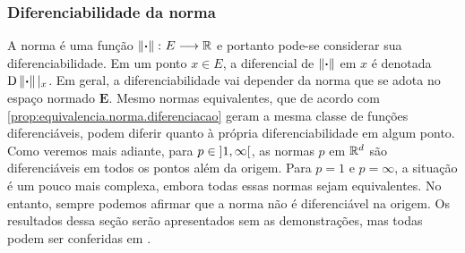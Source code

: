 \begin{comment}


\begin{proposition}
\label{prop:diferenciavel.propriedade}
Sejam $\bm E$ e $\bm E'$ espaços normados, $A \subseteq E$ um aberto, $x \in A$ e $\fun{f}{A}{E'}$ uma função diferenciável em $x$.
Se $\fun{\D f|_x}{E}{E'}$ é injetiva, então existem $\delta,c \in \R_{>0}$ tais que, para todos $x',x'' \in \bola{x}{\delta}$,
	\begin{equation*}
	\nor{f(x'') - f(x')} \geq c\nor{x''-x'}.
	\end{equation*}
Segue que $\fun{f|_{\bola{x}{\delta}}}{\bola{x}{\delta}}{f(\bola{x}{\delta})}$ é um homeomorfismo.
\end{proposition}

\begin{proposition}
\label{prop:fortemente.diferenciavel.propriedade}
Sejam $\bm E$ e $\bm E'$ espaços normados, $A \subseteq E$ um aberto, $x \in A$ e $\fun{f}{A}{E'}$ uma função fortemente diferenciável em $x$ tal que $\fun{\D f|_x}{E}{E'}$ é injetiva. Existem $\delta,c \in \R_{>0}$ tais que, para todos $x',x'' \in \bola{x}{\delta}$,
	\begin{equation*}
	\nor{f(x'') - f(x')} \geq c\nor{x''-x'}.
	\end{equation*}
Segue que $\fun{f|_{\bola{x}{\delta}}}{\bola{x}{\delta}}{f(\bola{x}{\delta})}$ é um homeomorfismo.
\end{proposition}
\begin{proof}
Da injetividade de $\D f|_x$ segue que existe $c \in \R_{>0}$ tal que, para todo $v \in E$,
	\begin{equation*}
	\nor{\D f|_x(v)} \geq 2c\nor{v}.
	\end{equation*}

\end{proof}


\end{comment}


\subsubsection{Diferenciabilidade da norma}

A norma é uma função $\left\Vert{\bm{\cdot}}\right\Vert\colon \allowbreak E \longrightarrow \mathbb{R}$ e portanto pode-se considerar sua diferenciabilidade. Em um ponto $x \in E$, a diferencial de $\left\Vert{\bm{\cdot}}\right\Vert$ em $x$ é denotada $\mathrm{D} \left\Vert{\bm{\cdot}}\right\Vert|_{x}$. Em geral, a diferenciabilidade vai depender da norma que se adota no espaço normado $\bm E$. Mesmo normas equivalentes, que de acordo com \ref{prop:equivalencia.norma.diferenciacao} geram a mesma classe de funções diferenciáveis, podem diferir quanto à própria diferenciabilidade em algum ponto. Como veremos mais adiante, para $p \in \left]1,\allowbreak \infty\right[$, as normas $p$ em $\mathbb{R}^d$ são diferenciáveis em todos os pontos além da origem. Para $p = 1$ e $p=\infty$, a situação é um pouco mais complexa, embora todas essas normas sejam equivalentes. No entanto, sempre podemos afirmar que a norma não é diferenciável na origem. Os resultados dessa seção serão apresentados sem as demonstrações, mas todas podem ser conferidas em \cite[]{liv:Coleman-CalculusNormedVectorSpaces}.

